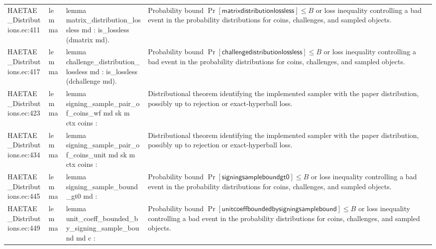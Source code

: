\documentclass[10pt]{article}
\begin{document}
\begin{longtable}{L{0.11\textwidth}L{0.055\textwidth}L{0.385\textwidth}L{0.41\textwidth}}
HAETAE\_\allowbreak{}Distributions.\allowbreak{}ec:\allowbreak{}411 & lemma & {\ttfamily\scriptsize lemma matrix\_\allowbreak{}distribution\_\allowbreak{}lossless md : is\_\allowbreak{}lossless (dmatrix md).} & Probability bound $\Pr[\mathsf{matrixdistributionlossless}]\le B$ or loss inequality controlling a bad event in the probability distributions for coins, challenges, and sampled objects. \\
HAETAE\_\allowbreak{}Distributions.\allowbreak{}ec:\allowbreak{}417 & lemma & {\ttfamily\scriptsize lemma challenge\_\allowbreak{}distribution\_\allowbreak{}lossless md : is\_\allowbreak{}lossless (dchallenge md).} & Probability bound $\Pr[\mathsf{challengedistributionlossless}]\le B$ or loss inequality controlling a bad event in the probability distributions for coins, challenges, and sampled objects. \\
HAETAE\_\allowbreak{}Distributions.\allowbreak{}ec:\allowbreak{}423 & lemma & {\ttfamily\scriptsize lemma signing\_\allowbreak{}sample\_\allowbreak{}pair\_\allowbreak{}of\_\allowbreak{}coins\_\allowbreak{}wf md sk m ctx coins :} & Distributional theorem identifying the implemented sampler with the paper distribution, possibly up to rejection or exact-hyperball loss. \\
HAETAE\_\allowbreak{}Distributions.\allowbreak{}ec:\allowbreak{}434 & lemma & {\ttfamily\scriptsize lemma signing\_\allowbreak{}sample\_\allowbreak{}pair\_\allowbreak{}of\_\allowbreak{}coins\_\allowbreak{}unit md sk m ctx coins :} & Distributional theorem identifying the implemented sampler with the paper distribution, possibly up to rejection or exact-hyperball loss. \\
HAETAE\_\allowbreak{}Distributions.\allowbreak{}ec:\allowbreak{}445 & lemma & {\ttfamily\scriptsize lemma signing\_\allowbreak{}sample\_\allowbreak{}bound\_\allowbreak{}gt0 md :} & Probability bound $\Pr[\mathsf{signingsampleboundgt0}]\le B$ or loss inequality controlling a bad event in the probability distributions for coins, challenges, and sampled objects. \\
HAETAE\_\allowbreak{}Distributions.\allowbreak{}ec:\allowbreak{}449 & lemma & {\ttfamily\scriptsize lemma unit\_\allowbreak{}coeff\_\allowbreak{}bounded\_\allowbreak{}by\_\allowbreak{}signing\_\allowbreak{}sample\_\allowbreak{}bound md c :} & Probability bound $\Pr[\mathsf{unitcoeffboundedbysigningsamplebound}]\le B$ or loss inequality controlling a bad event in the probability distributions for coins, challenges, and sampled objects. \\

\end{longtable}
\end{document}
